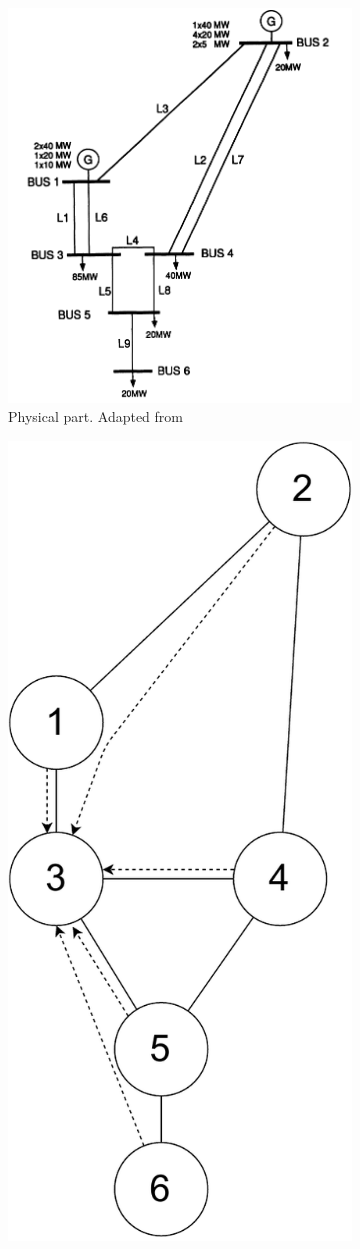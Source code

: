 \begin{figure}
     \centering
     \begin{subfigure}[b]{0.47\textwidth}
         \centering
         \includegraphics[width=\linewidth]{Figs/RBTS.png}
         \caption{Physical part. Adapted from~\cite{rbts}}
         \label{fig:RBTS-phys}
     \end{subfigure}
     \hfill
     \begin{subfigure}[b]{0.47\textwidth}
         \centering
         \includegraphics[width=0.5\linewidth]{Figs/RBTS_com.pdf}

\end{subfigure}
\end{figure}
